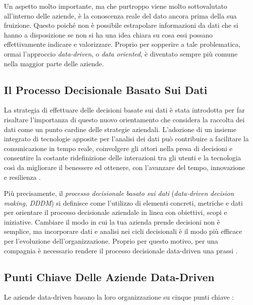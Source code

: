 Un aspetto molto importante, ma che purtroppo viene molto sottovalutato all'interno delle aziende, è la conoscenza reale del dato ancora prima della sua fruizione. Questo poiché non è possibile estrapolare informazioni da dati che si hanno a disposizione se non si ha una idea chiara su cosa essi possano effettivamente indicare e valorizzare. Proprio per sopperire a tale problematica, ormai l'approccio \textit{data-driven}, o \textit{data oriented}, è diventato sempre più comune nella maggior parte delle aziende.

\subsection{Il Processo Decisionale Basato Sui Dati}

La strategia di effettuare delle decisioni basate sui dati è stata introdotta per far risaltare l'importanza di questo nuovo orientamento che considera la raccolta dei dati come un punto cardine delle strategie aziendali. L'adozione di un insieme integrato di tecnologie apposite per l'analisi dei dati può contribuire a facilitare la comunicazione in tempo reale, coinvolgere gli attori nella presa di decisioni e consentire la costante ridefinizione delle interazioni tra gli utenti e la tecnologia così da migliorare il benessere ed ottenere, con l'avanzare del tempo, innovazione e resilienza \cite{emerald_data_driven_orientation}.

Più precisamente, il \textit{processo decisionale basato sui dati} (\textit{data-driven decision making, DDDM}) si definisce come l'utilizzo di elementi concreti, metriche e dati per orientare il processo decisionale aziendale in linea con obiettivi, scopi e iniziative. Cambiare il modo in cui la tua azienda prende decisioni non è semplice, ma incorporare dati e analisi nei cicli decisionali è il modo più efficace per l'evoluzione dell'organizzazione. Proprio per questo motivo, per una compagnia è necessario rendere il processo decisionale data-driven una prassi \cite{tableau_data_driven_decision_making}.

\subsection{Punti Chiave Delle Aziende Data-Driven}
Le aziende data-driven basano la loro organizzazione su cinque punti chiave \cite{researchgate_data_driven_orientation}:

